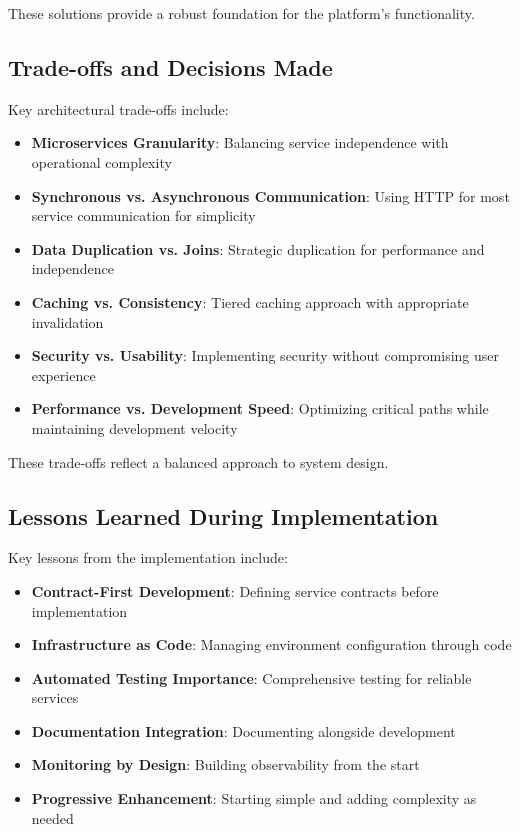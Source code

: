 These solutions provide a robust foundation for the platform's functionality.

\subsection{Trade-offs and Decisions Made}
Key architectural trade-offs include:
\begin{itemize}
    \item \textbf{Microservices Granularity}: Balancing service independence with operational complexity
    \item \textbf{Synchronous vs. Asynchronous Communication}: Using HTTP for most service communication for simplicity
    \item \textbf{Data Duplication vs. Joins}: Strategic duplication for performance and independence
    \item \textbf{Caching vs. Consistency}: Tiered caching approach with appropriate invalidation
    \item \textbf{Security vs. Usability}: Implementing security without compromising user experience
    \item \textbf{Performance vs. Development Speed}: Optimizing critical paths while maintaining development velocity
\end{itemize}

These trade-offs reflect a balanced approach to system design.

\subsection{Lessons Learned During Implementation}
Key lessons from the implementation include:
\begin{itemize}
    \item \textbf{Contract-First Development}: Defining service contracts before implementation
    \item \textbf{Infrastructure as Code}: Managing environment configuration through code
    \item \textbf{Automated Testing Importance}: Comprehensive testing for reliable services
    \item \textbf{Documentation Integration}: Documenting alongside development
    \item \textbf{Monitoring by Design}: Building observability from the start
    \item \textbf{Progressive Enhancement}: Starting simple and adding complexity as needed
\end{itemize}

